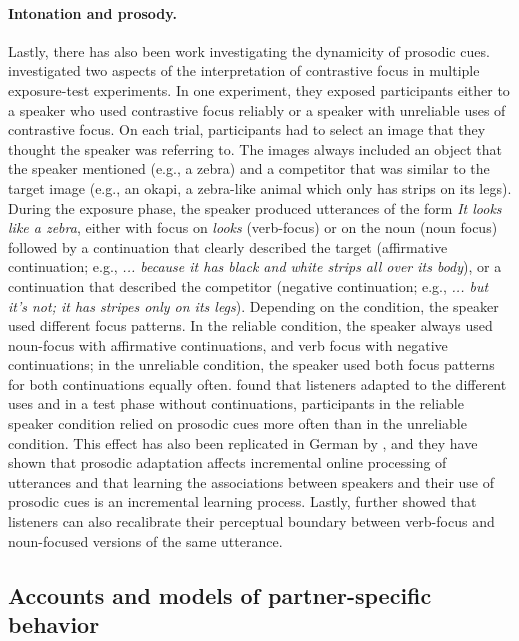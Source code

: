 \paragraph{Intonation and prosody.} Lastly, there has also been work investigating the dynamicity of prosodic cues. 
\textcite{Kurumada2012} investigated two aspects of the interpretation of contrastive focus in multiple exposure-test experiments. 
In one experiment, they exposed participants either to a speaker who used contrastive focus reliably or a speaker with unreliable
uses of contrastive focus. On each trial, participants had to select an image that they thought the speaker was referring to. The images
always included an object that the speaker mentioned (e.g., a zebra) and a competitor that was similar to the target image (e.g., an okapi,
a zebra-like animal which only has strips on its legs). During the exposure phase, the speaker produced utterances of the form \textit{It looks like a zebra}, either
with focus on \textit{looks} (verb-focus) or on the noun (noun focus) followed by a continuation that clearly described the target (affirmative continuation; e.g., \textit{... because it has black and white strips all over its body}),
or a continuation that described the competitor (negative continuation; e.g., \textit{... but it's not; it has stripes only on its legs}). Depending on the condition, 
the speaker used different focus patterns. In the reliable condition, the speaker always used noun-focus with affirmative continuations, and verb focus with
negative continuations; in the unreliable condition, the speaker used both focus patterns for both continuations equally often. \textcite{Kurumada2012} found
that listeners adapted to the different uses and in a test phase without continuations, participants in the reliable speaker condition relied on prosodic cues more
often than in the unreliable condition. This effect has also been replicated in German by \textcite{Roettger2019}, and they have shown that prosodic adaptation
affects incremental online processing of utterances and that learning the associations between speakers and their use of prosodic cues is an incremental learning process.
Lastly, \textcite{Kurumada2012} further showed that listeners can also recalibrate their perceptual boundary between verb-focus and noun-focused
versions of the same utterance.

\subsection{Accounts and models of partner-specific behavior}

